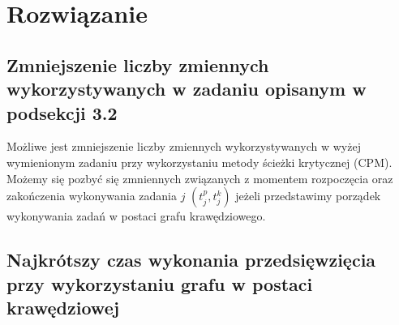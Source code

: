 \documentclass[
    12pt, %
]{../fphw}
\begin{document}
\section{Rozwiązanie}
\subsection{Zmniejszenie liczby zmiennych wykorzystywanych w zadaniu opisanym w podsekcji 3.2}
Możliwe jest zmniejszenie liczby zmiennych wykorzystywanych w wyżej wymienionym
zadaniu przy wykorzystaniu metody ścieżki krytycznej (CPM).
Możemy się pozbyć się zmniennych związanych z momentem rozpoczęcia oraz zakończenia
wykonywania zadania \(j\) \((t^p_j, t^k_j)\) jeżeli przedstawimy porządek wykonywania zadań w postaci grafu krawędziowego.

\subsection{Najkrótszy czas wykonania przedsięwzięcia przy wykorzystaniu grafu w postaci krawędziowej}
\end{document}
